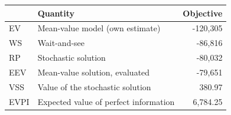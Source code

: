 \begin{tabular}{llr}
\toprule
 & Quantity & Objective \\
\midrule
EV & Mean-value model (own estimate) & -120,305 \\
WS & Wait-and-see & -86,816 \\
RP & Stochastic solution & -80,032 \\
EEV & Mean-value solution, evaluated & -79,651 \\
VSS & Value of the stochastic solution & 380.97 \\
EVPI & Expected value of perfect information & 6,784.25 \\
\bottomrule
\end{tabular}
